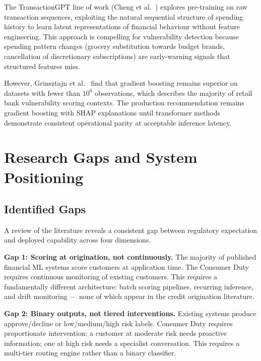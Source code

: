 \documentclass[12pt, a4paper]{article}
\begin{document}
The TransactionGPT line of work (Cheng et al.\ \cite{cheng2024}) explores
pre-training on raw transaction sequences, exploiting the natural sequential
structure of spending history to learn latent representations of financial
behaviour without feature engineering.
This approach is compelling for vulnerability detection because spending pattern
changes (grocery substitution towards budget brands, cancellation of discretionary
subscriptions) are early-warning signals that structured features miss.

However, Grinsztajn et al.\ \cite{grinsztajn2022} find that gradient boosting
remains superior on datasets with fewer than $10^6$ observations, which describes
the majority of retail bank vulnerability scoring contexts.
The production recommendation remains gradient boosting with SHAP explanations
until transformer methods demonstrate consistent operational parity at acceptable
inference latency.

\section{Research Gaps and System Positioning}

\subsection{Identified Gaps}

A review of the literature reveals a consistent gap between regulatory expectation
and deployed capability across four dimensions.

\textbf{Gap 1: Scoring at origination, not continuously.}
The majority of published financial ML systems score customers at application time.
The Consumer Duty requires continuous monitoring of existing customers.
This requires a fundamentally different architecture: batch scoring pipelines,
recurring inference, and drift monitoring --- none of which appear in the credit
origination literature.

\textbf{Gap 2: Binary outputs, not tiered interventions.}
Existing systems produce approve/decline or low/medium/high risk labels.
Consumer Duty requires proportionate intervention: a customer at moderate risk
needs proactive information; one at high risk needs a specialist conversation.
This requires a multi-tier routing engine rather than a binary classifier.
\end{document}
